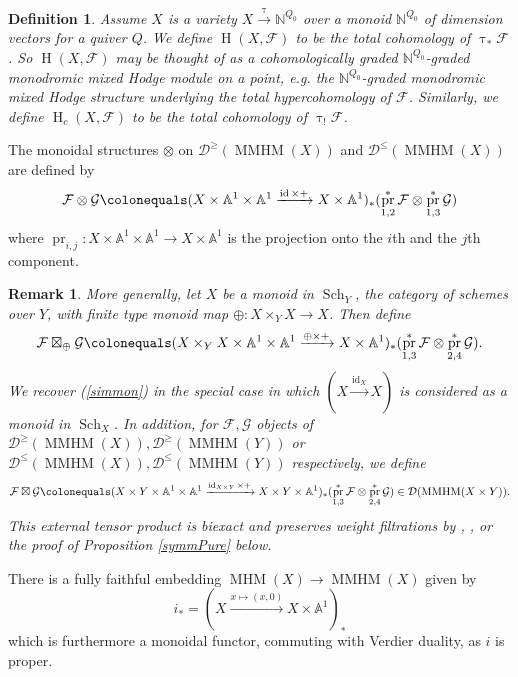 \documentclass[a4paper,10pt]{amsart}
\renewcommand{\tau}{\uptau}
\newtheorem{definition}[theorem]{Definition}
\newtheorem{remark}[theorem]{Remark}
\renewcommand{\AA}{\mathbb{A}}
\DeclareMathOperator{\MMHM}{MMHM}
\DeclareMathOperator{\dd}{\mathbf{d}}
\DeclareMathOperator{\MHM}{MHM}
\newcommand{\Sch}[1]{\sch_{#1}}
\DeclareMathOperator{\sch}{Sch}
\DeclareMathOperator{\id}{id}
\DeclareMathOperator{\HO}{H}
\DeclareMathOperator{\pr}{pr}
\newcommand{\Du}{\mathcal{D}^{\geq}}
\newcommand{\Dl}{\mathcal{D}^{\leq}}
\newcommand{\Dub}{\mathcal{D}}
\begin{document}
\begin{definition}
Assume $X$ is a variety $X\xrightarrow{\tau}\mathbb{N}^{Q_0}$ over a monoid $\mathbb{N}^{Q_0}$ of dimension vectors for a quiver $Q$. %
We define $\HO(X,\mathcal{F})$ to be the total cohomology of $\tau_*\mathcal{F}$.  So $\HO(X,\mathcal{F})$ may be thought of as a cohomologically graded $\mathbb{N}^{Q_0}$-graded monodromic mixed Hodge module on a point, e.g. the $\mathbb{N}^{Q_0}$-graded monodromic mixed Hodge structure underlying the total hypercohomology of $\mathcal{F}$.  Similarly, we define $\HO_c(X,\mathcal{F})$ to be the total cohomology of $\tau_!\mathcal{F}$.
\end{definition}

The monoidal structures $\otimes$ on $\Du(\MMHM(X))$ and $\Dl(\MMHM(X))$ are defined by 
\begin{equation}
\label{simmon}
\mathcal{F}\otimes\mathcal{G}\colonequals (X\times \AA^1\times \AA^1\xrightarrow{\id \times +}X\times \AA^1)_*(\pr_{1,2}^*\mathcal{F}\otimes\pr_{1,3}^*\mathcal{G})
\end{equation}
where $\pr_{i,j}\colon X\times\AA^1\times\AA^1\rightarrow X\times\AA^1$ is the projection onto the $i$th and the $j$th component.  
\begin{remark}
\label{convProdDef}
More generally, let $X$ be a monoid in $\Sch{Y}$, the category of schemes over $Y$, with finite type monoid map $\oplus\colon X\times_Y X\rightarrow X$.  Then define
\[
\mathcal{F}\boxtimes_{\oplus} \mathcal{G}\colonequals (X\times_Y X\times \mathbb{A}^1\times\mathbb{A}^1\xrightarrow{\oplus\times +} X\times\mathbb{A}^1)_*(\pr_{1,3}^*\mathcal{F}\otimes\pr_{2,4}^*\mathcal{G}).
\]
We recover (\ref{simmon}) in the special case in which $(X\xrightarrow{\id_X} X)$ is considered as a monoid in $\Sch{X}$.  In addition, for $\mathcal{F},\mathcal{G}$ objects of $\Du(\MMHM(X)),\Du(\MMHM(Y))$ or $\Dl(\MMHM(X)),\Dl(\MMHM(Y))$ respectively, we define
\[
\mathcal{F}\boxtimes \mathcal{G}\colonequals (X\times Y\times\mathbb{A}^1\times\mathbb{A}^1\xrightarrow{\id_{X\times Y}\times +} X\times Y\times \mathbb{A}^1)_*(\pr_{1,3}^*\mathcal{F}\otimes\pr_{2,4}^*\mathcal{G})\in\Dub(\MMHM(X\times Y)).
\]
This external tensor product is biexact and preserves weight filtrations by \cite[Sec.4]{KS2}, \cite[Prop.3.2]{Da16a}, or the proof of Proposition \ref{symmPure} below.

\end{remark}
There is a fully faithful embedding $\MHM(X)\rightarrow \MMHM(X)$ given by 
\[
i_*=(X\xrightarrow{x\mapsto (x,0)} X\times\AA^1)_*
\]
which is furthermore a monoidal functor, commuting with Verdier duality, as $i$ is proper.
\end{document}
